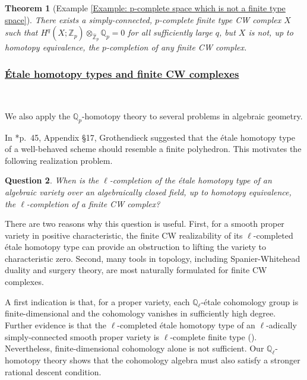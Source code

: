 \documentclass[11pt]{amsart}
\newtheorem{theorem}{Theorem}[section]
\newtheorem{question}[theorem]{Question}
\theoremstyle{definition}
\numberwithin{equation}{section}
\numberwithin{equation}{section}
\newcommand\QQ{\mathbb{Q}}
\newcommand\ZZ{\mathbb{Z}}
\begin{document}
\begin{theorem}[Example \ref{Example: p-complete space which is not a finite type space}]
There exists a simply-connected, $p$-complete finite type CW complex $X$ such that $H^q(X;\widehat{\ZZ}_p)\otimes_{\widehat{\ZZ}_p} \QQ_p=0$ for all sufficiently large $q$, but $X$ is not, up to homotopy equivalence, the $p$-completion of any finite CW complex.
\end{theorem}

\subsubsection*{\underline{\'Etale homotopy types and finite CW complexes}}\,

We also apply the $\QQ_p$-homotopy theory to several problems in algebraic geometry. 

In \cite{grothendieck2021pursuing}*{p.~45, Appendix \S17}, Grothendieck suggested that the \'etale
homotopy type of a well-behaved scheme should resemble a finite polyhedron. This motivates the following realization problem.

\begin{question}\label{Question: finite CW complex for varieties}
When is the $\ell$-completion of the \'etale homotopy type of an algebraic variety over an algebraically closed field, up to homotopy equivalence, the $\ell$-completion of a finite CW complex?
\end{question}

There are two reasons why this question is useful. First, for a smooth proper variety in positive characteristic, the finite CW realizability of its
$\ell$-completed \'etale homotopy type can provide an obstruction to lifting the variety to characteristic zero. Second, many tools in topology, including Spanier-Whitehead duality and surgery theory, are most naturally formulated for finite CW complexes.

A first indication is that, for a proper variety, each $\QQ_{\ell}$-\'etale cohomology group is finite-dimensional and the cohomology vanishes in sufficiently high degree. Further evidence is that the $\ell$-completed \'etale homotopy type of an $\ell$-adically simply-connected smooth proper variety is $\ell$-complete finite type (\cite{Hu-Zhang-formal-manifold-structures}). Nevertheless, finite-dimensional cohomology alone is not sufficient. Our $\QQ_\ell$-homotopy theory shows that the cohomology algebra must  also satisfy a stronger rational descent condition.
\end{document}
